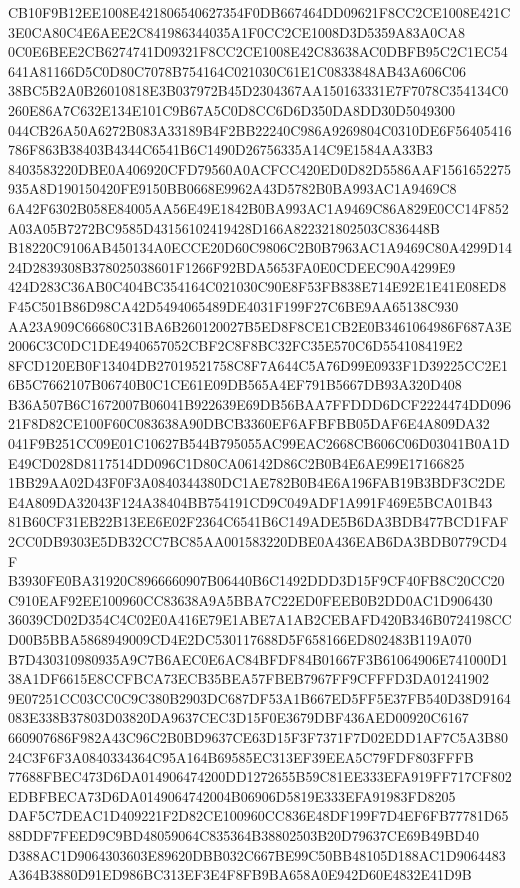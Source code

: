 \documentclass[UTF8,fontset=fandol,zihao=-4,a4paper]{ctexart}
\begin{document}
{{CB10F9B12EE1008E421806540627354F0DB667464DD09621F8CC2CE1008E421C3E0CA80C4E6AEE2C841986344035A1F0CC2CE1008D3D5359A83A0CA8
0C0E6BEE2CB6274741D09321F8CC2CE1008E42C83638AC0DBFB95C2C1EC54641A81166D5C0D80C7078B754164C021030C61E1C0833848AB43A606C06
38BC5B2A0B26010818E3B037972B45D2304367AA150163331E7F7078C354134C0260E86A7C632E134E101C9B67A5C0D8CC6D6D350DA8DD30D5049300
044CB26A50A6272B083A33189B4F2BB22240C986A9269804C0310DE6F56405416786F863B38403B4344C6541B6C1490D26756335A14C9E1584AA33B3
8403583220DBE0A406920CFD79560A0ACFCC420ED0D82D5586AAF1561652275935A8D190150420FE9150BB0668E9962A43D5782B0BA993AC1A9469C8
6A42F6302B058E84005AA56E49E1842B0BA993AC1A9469C86A829E0CC14F852A03A05B7272BC9585D43156102419428D166A822321802503C836448B
B18220C9106AB450134A0ECCE20D60C9806C2B0B7963AC1A9469C80A4299D1424D2839308B378025038601F1266F92BDA5653FA0E0CDEEC90A4299E9
424D283C36AB0C404BC354164C021030C90E8F53FB838E714E92E1E41E08ED8F45C501B86D98CA42D5494065489DE4031F199F27C6BE9AA65138C930
AA23A909C66680C31BA6B260120027B5ED8F8CE1CB2E0B3461064986F687A3E2006C3C0DC1DE4940657052CBF2C8F8BC32FC35E570C6D554108419E2
8FCD120EB0F13404DB27019521758C8F7A644C5A76D99E0933F1D39225CC2E16B5C7662107B06740B0C1CE61E09DB565A4EF791B5667DB93A320D408
B36A507B6C1672007B06041B922639E69DB56BAA7FFDDD6DCF2224474DD09621F8D82CE100F60C083638A90DBCB3360EF6AFBFBB05DAF6E4A809DA32
041F9B251CC09E01C10627B544B795055AC99EAC2668CB606C06D03041B0A1DE49CD028D8117514DD096C1D80CA06142D86C2B0B4E6AE99E17166825
1BB29AA02D43F0F3A0840344380DC1AE782B0B4E6A196FAB19B3BDF3C2DEE4A809DA32043F124A38404BB754191CD9C049ADF1A991F469E5BCA01B43
81B60CF31EB22B13EE6E02F2364C6541B6C149ADE5B6DA3BDB477BCD1FAF2CC0DB9303E5DB32CC7BC85AA001583220DBE0A436EAB6DA3BDB0779CD4F
B3930FE0BA31920C8966660907B06440B6C1492DDD3D15F9CF40FB8C20CC20C910EAF92EE100960CC83638A9A5BBA7C22ED0FEEB0B2DD0AC1D906430
36039CD02D354C4C02E0A416E79E1ABE7A1AB2CEBAFD420B346B0724198CCD00B5BBA5868949009CD4E2DC530117688D5F658166ED802483B119A070
B7D430310980935A9C7B6AEC0E6AC84BFDF84B01667F3B61064906E741000D138A1DF6615E8CCFBCA73ECB35BEA57FBEB7967FF9CFFFD3DA01241902
9E07251CC03CC0C9C380B2903DC687DF53A1B667ED5FF5E37FB540D38D9164083E338B37803D03820DA9637CEC3D15F0E3679DBF436AED00920C6167
660907686F982A43C96C2B0BD9637CE63D15F3F7371F7D02EDD1AF7C5A3B8024C3F6F3A0840334364C95A164B69585EC313EF39EEA5C79FDF803FFFB
77688FBEC473D6DA014906474200DD1272655B59C81EE333EFA919FF717CF802EDBFBECA73D6DA0149064742004B06906D5819E333EFA91983FD8205
DAF5C7DEAC1D409221F2D82CE100960CC836E48DF199F7D4EF6FB77781D6588DDF7FEED9C9BD48059064C835364B38802503B20D79637CE69B49BD40
D388AC1D9064303603E89620DBB032C667BE99C50BB48105D188AC1D9064483A364B3880D91ED986BC313EF3E4F8FB9BA658A0E942D60E4832E41D9B
}}
\end{document}
